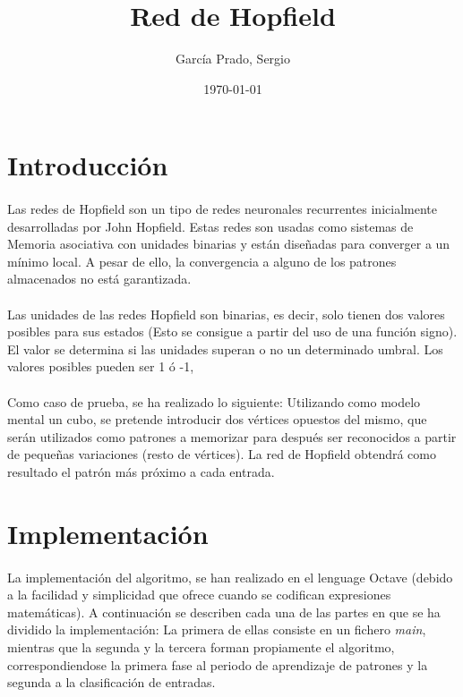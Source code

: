\documentclass[10pt, a4paper,spanish]{article}
\title{\vspace{-15mm}\fontsize{24pt}{10pt}\selectfont\textbf{Red de Hopfield}}
\author{García Prado, Sergio}
\date{\today}
\begin{document}
	\maketitle

	\thispagestyle{fancy}




  \section{Introducción}

    \paragraph{}
		Las redes de Hopfield son un tipo de redes neuronales recurrentes inicialmente desarrolladas por John Hopfield. Estas redes son usadas como sistemas de Memoria asociativa con unidades binarias y están diseñadas para converger a un mínimo local. A pesar de ello, la convergencia a alguno de los patrones almacenados no está garantizada.

		\paragraph{}
		Las unidades de las redes Hopfield son binarias, es decir, solo tienen dos valores posibles para sus estados (Esto se consigue a partir del uso de una función signo). El valor se determina si las unidades superan o no un determinado umbral. Los valores posibles pueden ser 1 ó -1,

		\paragraph{}
		Como caso de prueba, se ha realizado lo siguiente: Utilizando como modelo mental un cubo, se pretende introducir dos vértices opuestos del mismo, que serán utilizados como patrones a memorizar para después ser reconocidos a partir de pequeñas variaciones (resto de vértices). La red de Hopfield obtendrá como resultado el patrón más próximo a cada entrada.


	\section{Implementación}

		\paragraph{}
		La implementación del algoritmo, se han realizado en el lenguage Octave (debido a la facilidad y simplicidad que ofrece cuando se codifican expresiones matemáticas). A continuación se describen cada una de las partes en que se ha dividido la implementación: La primera de ellas consiste en un fichero \emph{main}, mientras que la segunda y la tercera forman propiamente el algoritmo, correspondiendose la primera fase al periodo de aprendizaje de patrones y la segunda a la clasificación de entradas.
\end{document}
